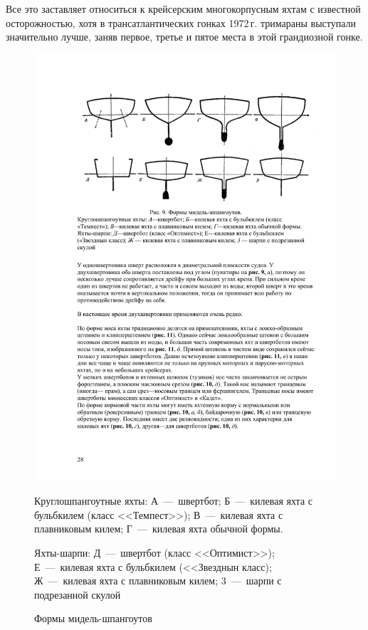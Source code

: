\documentclass[a4paper, 12pt, twoside, final]{scrbook}
\begin{document}
Все это заставляет относиться к крейсерским многокорпусным яхтам с
известной осторожностью, хотя в трансатлантических гонках 1972\,г.
тримараны выступали значительно лучше, заняв первое, третье и пятое
места в этой грандиозной гонке.

\begin{figure}[htbp]
\centering
\includegraphics[scale=0.9]{Formy_midel_shpangoutov}
\protect\caption{\label{fig:9}Формы мидель-шпангоутов}

\begin{centering}\small
Круглошпангоутные яхты: А~---~швертбот; Б~---~килевая яхта с бульбкилем
(класс <<Темпест>>); В~---~килевая яхта с плавниковым килем; Г~---~килевая
яхта обычной формы.
\par\end{centering}

\centering{}\small
Яхты-шарпи: Д~---~швертбот (класс <<Оптимист>>); Е~---~килевая
яхта с бульбкилем (<<Звезднын класс); Ж~---~килевая яхта с плавниковым
килем; 3~---~шарпи с подрезанной скулой
\end{figure}
\end{document}
